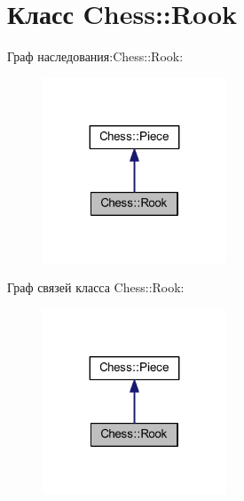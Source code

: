 \hypertarget{class_chess_1_1_rook}{}\section{Класс Chess\+:\+:Rook}
\label{class_chess_1_1_rook}


Граф наследования\+:Chess\+:\+:Rook\+:\nopagebreak
\begin{figure}[H]
\begin{center}
\leavevmode
\includegraphics[width=155pt]{class_chess_1_1_rook__inherit__graph}
\end{center}
\end{figure}


Граф связей класса Chess\+:\+:Rook\+:\nopagebreak
\begin{figure}[H]
\begin{center}
\leavevmode
\includegraphics[width=155pt]{class_chess_1_1_rook__coll__graph}
\end{center}
\end{figure}
